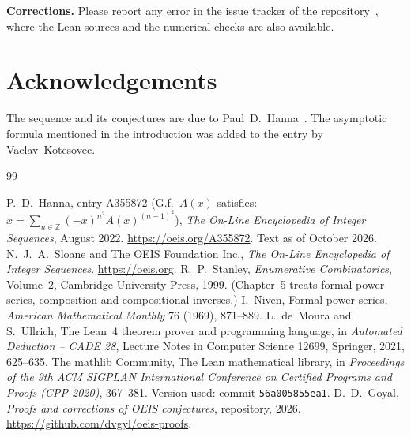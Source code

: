 \documentclass[11pt,a4paper]{article}
\theoremstyle{definition}
\theoremstyle{remark}
\newcommand{\Z}{\mathbb{Z}}
\newcommand{\para}[1]{\par\medskip\noindent\textbf{#1}\enspace}
\begin{document}
\para{Corrections.} Please report any error in the issue tracker of the repository~\cite{repo}, where the Lean sources and the numerical checks are also
available.

\section*{Acknowledgements}
The sequence and its conjectures are due to Paul~D.~Hanna~\cite{oeis}. The asymptotic formula mentioned in the
introduction was added to the entry by Vaclav~Kotesovec.

\begin{thebibliography}{99}\small
\raggedright
{} P.~D.~Hanna, entry A355872 (G.f.\ $A(x)$ satisfies: $x=\sum_{n\in\Z}(-x)^{n^2}A(x)^{(n-1)^2}$), \emph{The On-Line Encyclopedia of Integer Sequences}, August 2022. \url{https://oeis.org/A355872}. Text as of October 2026.
 N.~J.~A.~Sloane and The OEIS Foundation Inc., \emph{The On-Line Encyclopedia of Integer Sequences}. \url{https://oeis.org}.
 R.~P.~Stanley, \emph{Enumerative Combinatorics}, Volume~2, Cambridge University Press, 1999. (Chapter~5 treats formal power series, composition and compositional inverses.)
 I.~Niven, Formal power series, \emph{American Mathematical Monthly} 76 (1969), 871--889.
 L.~de~Moura and S.~Ullrich, The Lean~4 theorem prover and programming language, in \emph{Automated Deduction -- CADE 28}, Lecture Notes in Computer Science 12699, Springer, 2021, 625--635.
 The mathlib Community, The Lean mathematical library, in \emph{Proceedings of the 9th ACM SIGPLAN International Conference on Certified Programs and Proofs (CPP 2020)}, 367--381. Version used: commit \texttt{56a005855ea1}.
 D.~D.~Goyal, \emph{Proofs and corrections of OEIS conjectures}, repository, 2026. \url{https://github.com/dvgyl/oeis-proofs}.
\end{thebibliography}
\end{document}
